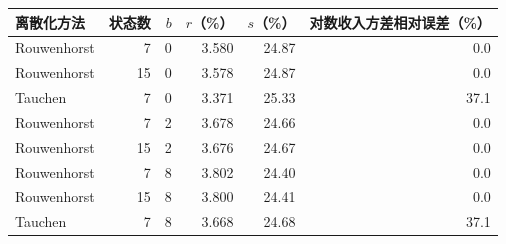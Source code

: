 \begin{tabular}{lrrrrr}
\toprule
离散化方法 & 状态数 & $b$ & $r$（\%） & $s$（\%） & 对数收入方差相对误差（\%） \\
\midrule
Rouwenhorst & 7 & 0 & 3.580 & 24.87 & 0.0 \\
Rouwenhorst & 15 & 0 & 3.578 & 24.87 & 0.0 \\
Tauchen & 7 & 0 & 3.371 & 25.33 & 37.1 \\
\midrule
Rouwenhorst & 7 & 2 & 3.678 & 24.66 & 0.0 \\
Rouwenhorst & 15 & 2 & 3.676 & 24.67 & 0.0 \\
\midrule
Rouwenhorst & 7 & 8 & 3.802 & 24.40 & 0.0 \\
Rouwenhorst & 15 & 8 & 3.800 & 24.41 & 0.0 \\
Tauchen & 7 & 8 & 3.668 & 24.68 & 37.1 \\
\bottomrule
\end{tabular}
